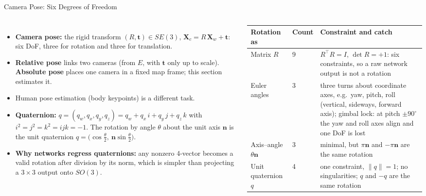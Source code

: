 \begin{frame}{Camera Pose: Six Degrees of Freedom}
  \begin{columns}[T,onlytextwidth]
      \begin{itemize}\footnotesize\itemsep0.3em
        \item \textbf{Camera pose:} the rigid transform $(R,\mathbf{t})\in SE(3)$, $\mathbf{X}_c=R\,\mathbf{X}_w+\mathbf{t}$: six DoF, three for rotation and three for translation.
        \item \textbf{Relative pose} links two cameras (from $E$, with $\mathbf{t}$ only up to scale). \textbf{Absolute pose} places one camera in a fixed map frame; this section estimates it.
        \item Human pose estimation (body keypoints) is a different task.
        \item \textbf{Quaternion:} $q=(q_w,q_x,q_y,q_z)=q_w+q_x\,i+q_y\,j+q_z\,k$ with $i^2=j^2=k^2=ijk=-1$. The rotation by angle $\theta$ about the unit axis $\mathbf{n}$ is the unit quaternion $q=\big(\cos\tfrac{\theta}{2},\ \mathbf{n}\sin\tfrac{\theta}{2}\big)$.
        \item \textbf{Why networks regress quaternions:} any nonzero 4-vector becomes a valid rotation after division by its norm, which is simpler than projecting a $3\times3$ output onto $SO(3)$.
      \end{itemize}
      \centering
      {\scriptsize\setlength{\tabcolsep}{3pt}
      \begin{tabular}{>{\raggedright\arraybackslash}p{1.55cm} p{0.75cm} >{\raggedright\arraybackslash}p{4.1cm}}
        \toprule
        \textbf{Rotation as} & \textbf{Count} & \textbf{Constraint and catch} \\
        \midrule
        Matrix $R$ & 9 & $R^\top R=I$, $\det R=+1$: six constraints, so a raw network output is not a rotation \\
        \addlinespace[0.2em]
        Euler angles & 3 & three turns about coordinate axes, e.g.\ yaw, pitch, roll (vertical, sideways, forward axis); gimbal lock: at pitch $\pm90^\circ$ the yaw and roll axes align and one DoF is lost \\
        \addlinespace[0.2em]
        Axis--angle $\theta\mathbf{n}$ & 3 & minimal, but $\pi\mathbf{n}$ and $-\pi\mathbf{n}$ are the same rotation \\
        \addlinespace[0.2em]
        Unit quaternion $q$ & 4 & one constraint, $\lVert q\rVert=1$; no singularities; $q$ and $-q$ are the same rotation \\

\end{tabular}}
\end{columns}
\end{frame}
